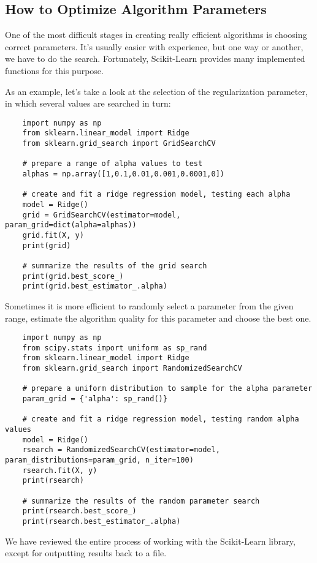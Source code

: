\documentclass[a4paper,12pt]{article}
\begin{document}
\newpage

\subsection{How to Optimize Algorithm Parameters}
One of the most difficult stages in creating really efficient algorithms is choosing correct parameters. It’s usually easier with experience, but one way or another, we have to do the search. Fortunately, Scikit-Learn provides many implemented functions for this purpose.

As an example, let’s take a look at the selection of the regularization parameter, in which several values are searched in turn:

\begin{framed}
	\begin{verbatim}
	import numpy as np
	from sklearn.linear_model import Ridge
	from sklearn.grid_search import GridSearchCV
	
	# prepare a range of alpha values to test
	alphas = np.array([1,0.1,0.01,0.001,0.0001,0])
	
	# create and fit a ridge regression model, testing each alpha
	model = Ridge()
	grid = GridSearchCV(estimator=model, param_grid=dict(alpha=alphas))
	grid.fit(X, y)
	print(grid)
	
	# summarize the results of the grid search
	print(grid.best_score_)
	print(grid.best_estimator_.alpha)
	\end{verbatim}
\end{framed}
Sometimes it is more efficient to randomly select a parameter from the given range, estimate the algorithm quality for this parameter and choose the best one.

\begin{framed}
	\begin{verbatim}
	import numpy as np
	from scipy.stats import uniform as sp_rand
	from sklearn.linear_model import Ridge
	from sklearn.grid_search import RandomizedSearchCV
	
	# prepare a uniform distribution to sample for the alpha parameter
	param_grid = {'alpha': sp_rand()}
	
	# create and fit a ridge regression model, testing random alpha values
	model = Ridge()
	rsearch = RandomizedSearchCV(estimator=model, param_distributions=param_grid, n_iter=100)
	rsearch.fit(X, y)
	print(rsearch)
	
	# summarize the results of the random parameter search
	print(rsearch.best_score_)
	print(rsearch.best_estimator_.alpha)
	\end{verbatim}
\end{framed}
We have reviewed the entire process of working with the Scikit-Learn library, except for outputting results back to a file. 
\end{document}
